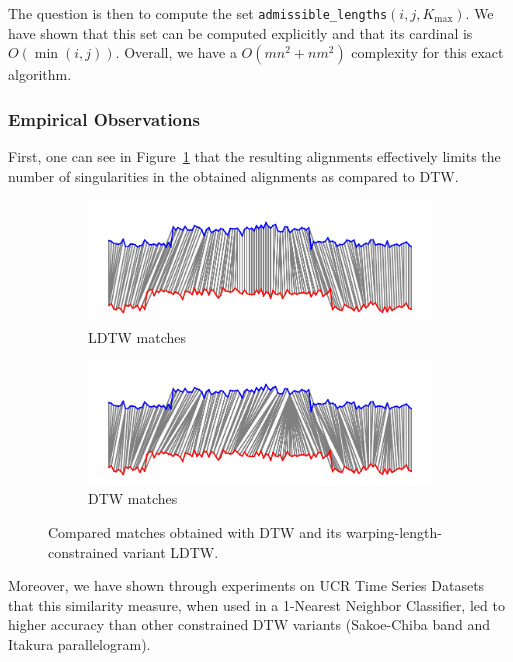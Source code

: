 The question is then to compute the set
\texttt{admissible\_lengths}$(i, j, K_\text{max})$.
We have shown that this set can be computed explicitly and that its cardinal
is $O(\min(i, j))$.
Overall, we have a $O(mn^2 + nm^2)$ complexity for this exact algorithm.

\subsubsection{Empirical Observations}

First, one can see in Figure~\ref{fig:ldtw} that the resulting alignments
effectively limits the number of singularities in the obtained alignments as
compared to DTW.

\begin{figure}[t]
    \begin{subfigure}[b]{\textwidth}
         \centering
         \includegraphics[width=.8\textwidth]{fig/dtw_warping_length}
         \caption{LDTW matches}
     \end{subfigure}
     \begin{subfigure}[b]{\textwidth}
          \centering
          \includegraphics[width=.8\textwidth]{fig/dtw_warping_length_b}
          \caption{DTW matches}
      \end{subfigure}
    \caption{Compared matches obtained with DTW and its
    warping-length-constrained variant LDTW.}
    \label{fig:ldtw}
\end{figure}

Moreover, we have shown through experiments on UCR Time Series Datasets that
this similarity measure, when used in a 1-Nearest Neighbor Classifier, led to
higher accuracy than other constrained DTW variants
(Sakoe-Chiba band and Itakura parallelogram).
